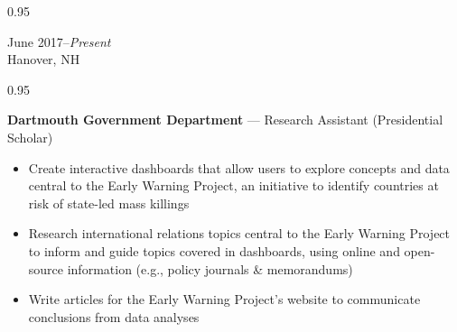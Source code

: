 \documentclass[a4paper,9pt]{article}
\newcommand{\mainMarginBottom}{\vspace*{1.5pt}}
\newcommand{\newLine}{\\}
\newcommand{\doubleColumnGap}{\hspace{4mm}}
\newcommand{\withinSectionMarginBetween}{\vspace{-3ex}}
\newcommand{\mainLineSpacing}{0.95}
\begin{document}
\begin{minipage}[t]{0.20\linewidth}
  \begin{small}
    \begin{spacing}\mainLineSpacing{}
      \begin{flushright}
        June 2017--\textit{Present}
        \newLine{}
        \mainMarginBottom{}
        Hanover, NH
      \end{flushright}
    \end{spacing}
  \end{small}
\end{minipage}
\doubleColumnGap{}
\begin{minipage}[t]{0.75\linewidth}
  \begin{small}
    \begin{spacing}\mainLineSpacing{}
      \begin{flushleft}
        \textbf{Dartmouth Government Department} --- Research Assistant (Presidential Scholar)
        \mainMarginBottom{}
        \begin{itemize}[itemsep=0pt,topsep=0pt,leftmargin=*]
          \item Create interactive dashboards that allow users to explore concepts and data central to the Early Warning Project,
                an initiative to identify countries at risk of state-led mass killings
          \item Research international relations topics central to the Early Warning Project to inform and guide topics covered in dashboards, using online and open-source information (e.g., policy journals \& memorandums)
          \item Write articles for the Early Warning Project's website to communicate conclusions from data analyses
        \end{itemize}
      \end{flushleft}
    \end{spacing}
  \end{small}
\end{minipage}

\withinSectionMarginBetween{}
\end{document}
